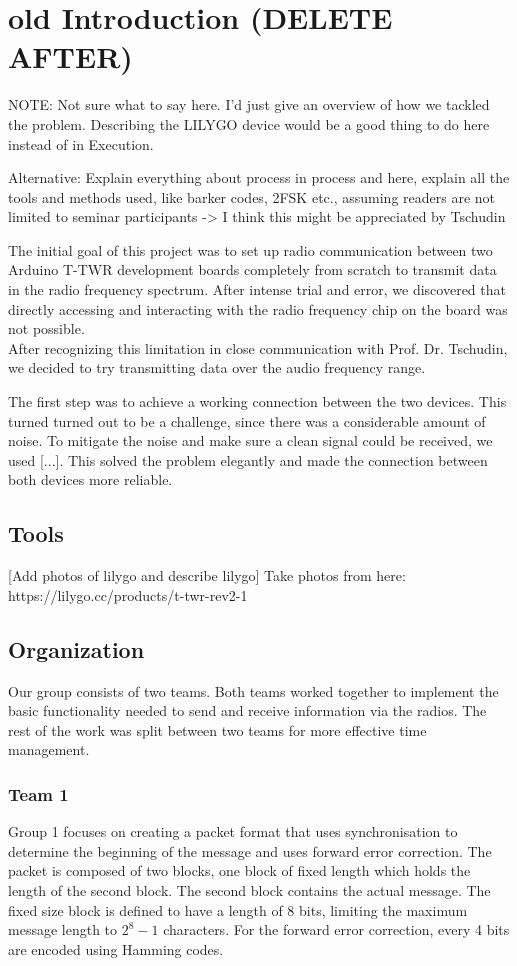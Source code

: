 \chapter{old Introduction (DELETE AFTER)}
{NOTE: Not sure what to say here. I'd just give an overview of how we tackled the problem.
Describing the LILYGO device would be a good thing to do here instead of in Execution.

Alternative:
Explain everything about process in process and here, explain all the tools and methods used, like barker codes, 2FSK etc., assuming readers are not limited to seminar participants -> I think this might be appreciated by Tschudin}





The initial goal of this project was to set up radio communication between two Arduino T-TWR development boards completely from scratch to transmit data in the radio frequency spectrum. After intense trial and error, we discovered that directly accessing and interacting with the radio frequency chip on the board was not possible.\\

After recognizing this limitation in close communication with Prof. Dr. Tschudin, we decided to try transmitting data over the audio frequency range.

The first step was to achieve a working connection between the two devices. This turned turned out to be a challenge, since there was a considerable amount of noise. To mitigate the noise and make sure a clean signal could be received, we used [...]. This solved the problem elegantly and made the connection between both devices more reliable.

\section{Tools}
[Add photos of lilygo and describe lilygo]
Take photos from here: https://lilygo.cc/products/t-twr-rev2-1

\section{Organization}
Our group consists of two teams. Both teams worked together to implement the basic functionality needed to send and receive information via the radios. The rest of the work was split between two teams for more effective time management.

\subsection{Team 1}
Group 1 focuses on creating a packet format that uses synchronisation to determine the beginning of the message and uses forward error correction. The packet is composed of two blocks, one block of fixed length which holds the length of the second block. The second block contains the actual message. The fixed size block is defined to have a length of 8 bits, limiting the maximum message length to $2^8-1$ characters.
For the forward error correction, every 4 bits are encoded using Hamming codes.
